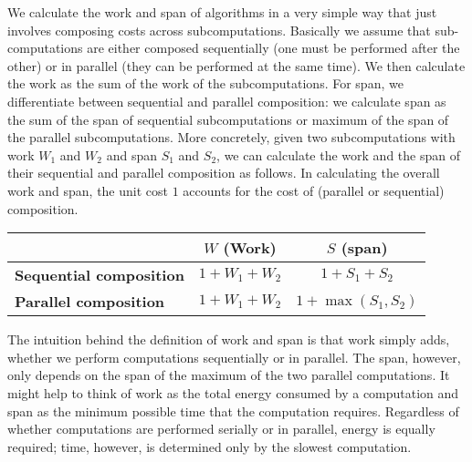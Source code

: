\begin{flex}
\label{grp:def:introduction::parallelism::work-and-span}

\begin{definition}
\label{def:introduction::parallelism::work-and-span}
We calculate the work and span of algorithms in a very
simple way that just involves composing costs across subcomputations.
Basically we assume that sub-computations are either composed
sequentially (one must be performed after the other) or in parallel
(they can be performed at the same time).
We then calculate the work as the sum of the work of the
subcomputations.
For span, we differentiate between sequential and parallel composition:
we calculate span as the sum of the span of sequential
subcomputations or maximum of the span of the parallel
subcomputations.
More concretely, given two subcomputations with work $W_1$ and $W_2$
and span $S_1$ and $S_2$, we can calculate the work and the span of
their sequential and parallel composition as follows.
In calculating the overall work and span, the unit cost $1$ accounts
for the cost of (parallel or sequential) composition.


\begin{center}
\renewcommand{\arraystretch}{1.5}
\begin{tabular}{lcc}
\toprule
                          &  \bf $W$ (Work) & \bf $S$ (span)\\
\midrule
\bf Sequential composition & $1 + W_1 + W_2$ & $1 + S_1+ S_2$\\
\midrule
\bf Parallel composition   & $1 + W_1 + W_2$ & $1 + \max(S_1, S_2)$\\
\bottomrule
\end{tabular}
\end{center}

\end{definition}

\begin{note}
\label{nt:introduction::parallelism::intuition}
The intuition behind the definition of work and span is that work
simply adds, whether we perform computations sequentially or in
parallel.  The span, however, only depends on the span of the maximum
of the two parallel computations.  It might help to think of work as
the total energy consumed by a computation and span as the minimum
possible time that the computation requires.  Regardless of whether
computations are performed serially or in parallel, energy is equally
required; time, however, is determined only by the slowest
computation.


\end{note}
\end{flex}
